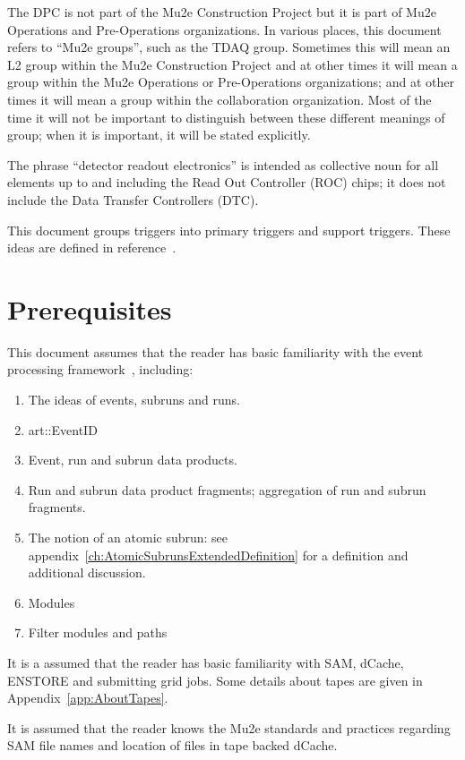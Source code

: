 The DPC is not part of the Mu2e Construction Project but it is part of Mu2e Operations
and Pre-Operations organizations.
In various places, this document refers to ``Mu2e groups'', such as the TDAQ group.
Sometimes this will mean an L2 group within the Mu2e Construction Project and at other
times it will mean a group within the Mu2e Operations or Pre-Operations organizations;
and at other times it will mean a group within the collaboration organization.
Most of the time it will not be important to distinguish between these different meanings
of group; when it is important, it will be stated explicitly.

The phrase ``detector readout electronics'' is intended as collective noun for all elements
up to and including the Read Out Controller (ROC) chips; it does not include
the Data Transfer Controllers (DTC).

This document groups triggers into primary triggers and support triggers.
These ideas are defined in reference~\cite{TriggerSU2020}.



\section{Prerequisites}
\label{sec:prerequisites}

This document assumes that the reader has basic familiarity with the \art event processing framework~\cite{ARTWORDPRESS}, including:

\begin{enumerate}
\item The ideas of events, subruns and runs.
\item {\code art::EventID}
\item Event, run and subrun  data products.
\item Run and subrun data product fragments; aggregation of run and subrun fragments.
\item The notion of an atomic subrun: see appendix~\ref{ch:AtomicSubrunsExtendedDefinition} for a definition and additional discussion.
\item Modules
\item Filter modules and paths
\end{enumerate}

It is a assumed that the reader has basic familiarity with SAM, dCache, ENSTORE and submitting grid jobs.
Some details about tapes are given in Appendix~\ref{app:AboutTapes}.

It is assumed that the reader knows the Mu2e standards and practices regarding SAM file names\cite{Mu2eSAM}
and location of files in tape backed dCache\cite{FileNames}.


